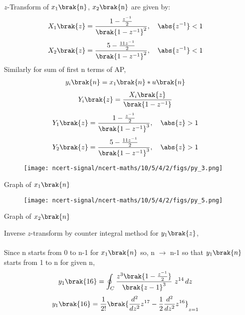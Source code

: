 \documentclass[journal,12pt,twocolumn]{IEEEtran}
\theoremstyle{remark}
\begin{document}
$z$-Transform of $x_1\brak{\text{n}}$, $x_2\brak{\text{n}}$ are given by:
\begin{align} X_1\brak{z}&=\frac{1-\frac{z^{-1}}{2}}{\brak{1-z^{-1}}^2},\quad \abs{z^{-1}}<1
\end{align}
\begin{align}X_2\brak{z}&=\frac{5-\frac{11z^{-1}}{2}}{\brak{1-z^{-1}}^2},\quad \abs{z^{-1}}<1
\end{align}
Similarly for sum of first n terms of AP,
\begin{align}
y_i\brak{n}&=x_1\brak{n}*u\brak{n}
\end{align}
\begin{align}
\label{w1}
Y_i\brak{z}&=\frac{X_i\brak{z}}{\brak{1-z^{-1}}}
\end{align}
\begin{align}
Y_1\brak{z}&=\frac{1-\frac{z^{-1}}{2}}{\brak{1-z^{-1}}^3},\quad \abs{z}>1
\end{align}
\begin{align}Y_2\brak{z}&=\frac{5-\frac{11z^{-1}}{2}}{\brak{1-z^{-1}}^3},\quad \abs{z}>1
\end{align}
\begin{figure}[h]
    \centering
    \texttt{[image: ncert-signal/ncert-maths/10/5/4/2/figs/py\_3.png]}
    \label{fig:x1n}
\end{figure}
\begin{center}
    Graph of $x_1\brak{n}$
\end{center}
\begin{figure}[h]
    \centering
    \texttt{[image: ncert-signal/ncert-maths/10/5/4/2/figs/py\_5.png]}
    \label{fig:x2n}
\end{figure}
\begin{center}
    Graph of $x_2\brak{n}$\\[20ex]
\end{center}
Inverse $z$-transform by counter integral method for  $y_1\brak{z}$,\\\\Since n starts from 0 to n-1 for $x_1\brak{n}$ so, n $\to$ n-1 so that $y_1\brak{n}$ starts from 1 to n for given n,\\
\begin{align}
y_1\brak{16}&=\oint_C \frac{z^3\brak{1-\frac{z^{-1}}{2}}}{\brak{z-1}^3}\ z^{14}\, dz
\end{align}
\begin{align}
y_1\brak{16}&=\frac{1}{2!}\brak{\frac{d^2}{dz^2}z^{17}-\frac{1}{2}\frac{d^2}{dz^2}z^{16}}_{z=1}  
\end{align}
\end{document}
